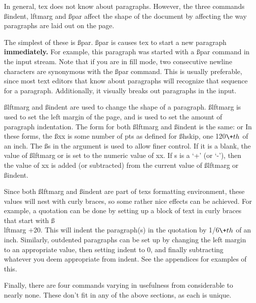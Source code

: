 
In general, tex does not know about paragraphs. However, the
three commands {\ss indent, lftmarg} and {\ss par} affect the shape
of the document by affecting the way paragraphs are laid out on
the page.\par The simplest of these is {\ss par.} {\ss par} is
causes tex to start a new paragraph {\bf immediately.} For
example, this paragraph was started with a {\ss par} command in
the input stream. Note that if you are in fill mode, two
consecutive newline characters are synonymous with the {\ss par}
command. This is usually preferable, since most text editors that
know about paragraphs will recognize that sequence for a
paragraph. Additionally, it visually breaks out paragraphs in the
input.

{\ss lftmarg} and {\ss indent} are used to change the shape of a
paragraph. {\ss lftmarg} is used to set the left margin of the page,
and {\indent} is used to set the amount of paragraph indentation.
The form for both {\ss lftmarg} and {\ss indent} is the same:
 or  In these
forms, the {\ss xx} is some number of pts as defined for {\ss hskip},
one 120$\+{th}$ of an inch. The {\ss s} in the argument is used to
allow finer control. If it is a blank, the value of {\ss lftmarg} or
{\indent} is set to the numeric value of xx. If s is a `+' (or
`-'), then the value of xx is added (or subtracted) from the
current value of {\ss lftmarg} or {\ss indent.}

Since both {\ss lftmarg} and {\ss indent} are part of texs
formatting environment, these values will nest with curly braces,
so some rather nice effects can be achieved. For example, a
quotation can be done by setting up a block of text in curly
braces that start with {\ss \\lftmarg +20.} This will indent the
paragraph(s) in the quotation by 1/6$\+{th}$ of an inch.
Similarly, outdented paragraphs can be set up by changing the
left margin to an appropriate value, then setting indent to 0,
and finally subtracting whatever you deem appropriate from
indent. See the appendices for examples of this.


Finally, there are four commands varying in usefulness from
considerable to nearly none. These don't fit in any of the above
sections, as each is unique.

